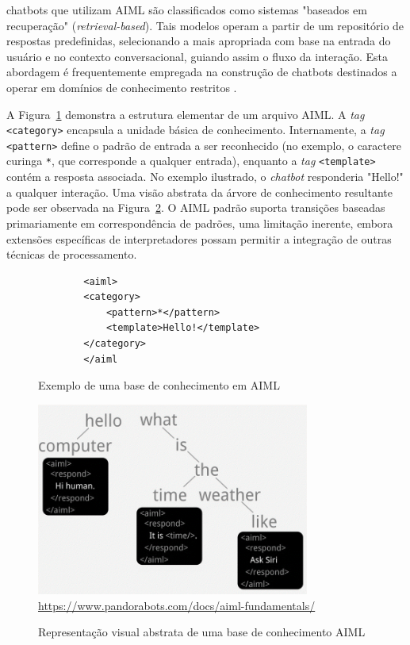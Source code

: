 \documentclass[a4paper,oneside]{book}
\begin{document}
chatbots que utilizam AIML são classificados como sistemas "baseados em recuperação" (\emph{retrieval-based}). Tais modelos operam a partir de um repositório de respostas predefinidas, selecionando a mais apropriada com base na entrada do usuário e no contexto conversacional, guiando assim o fluxo da interação. Esta abordagem é frequentemente empregada na construção de chatbots destinados a operar em domínios de conhecimento restritos \cite{Borah2019}.

A Figura~\ref{fig:exemplodeumabase} demonstra a estrutura elementar de um arquivo AIML. A \emph{tag} \texttt{<category>} encapsula a unidade básica de conhecimento. Internamente, a \emph{tag} \texttt{<pattern>} define o padrão de entrada a ser reconhecido (no exemplo, o caractere curinga \texttt{*}, que corresponde a qualquer entrada), enquanto a \emph{tag} \texttt{<template>} contém a resposta associada. No exemplo ilustrado, o \emph{chatbot} responderia "Hello!" a qualquer interação. Uma visão abstrata da árvore de conhecimento resultante pode ser observada na Figura~\ref{fig:representacaovisualabstrata}. O AIML padrão suporta transições baseadas primariamente em correspondência de padrões, uma limitação inerente, embora extensões específicas de interpretadores possam permitir a integração de outras técnicas de processamento.

\begin{figure}
	\centering
	\caption{Exemplo de uma base de conhecimento em AIML}
	\begin{verbatim}
		<aiml>
		<category>
			<pattern>*</pattern>
			<template>Hello!</template>
		</category>
		</aiml
	\end{verbatim}	
	\label{fig:exemplodeumabase}
	\vspace{0.2cm} %
    {\footnotesize \cite{Wallace2000}}
\end{figure}

\begin{figure}
    \centering
    \caption{Representação visual abstrata de uma base de conhecimento AIML}
    \includegraphics[width=0.8\textwidth]{./04-figuras/image12} %
    \label{fig:representacaovisualabstrata}
    \vspace{0.2cm} %
    {\footnotesize \url{https://www.pandorabots.com/docs/aiml-fundamentals/}}
\end{figure}
\end{document}
